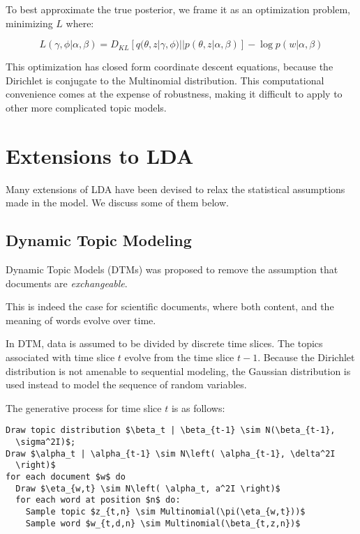\documentclass[letterpaper]{article}
\begin{document}
To best approximate the true posterior, we frame it as an optimization
problem, minimizing $L$ where:

\begin{equation}
L(\gamma, \phi | \alpha, \beta) = D_{KL}\left[ q(\theta, z | \gamma,
  \phi) || p(\theta, z | \alpha, \beta) \right] - \log p(w | \alpha, \beta)
\end{equation}

This optimization has closed form coordinate descent equations,
because the Dirichlet is conjugate to the Multinomial distribution.
This computational convenience comes at the expense of robustness,
making it difficult to apply to other more complicated topic models.

\section{Extensions to LDA}
\label{sec:ext:LDA}
Many extensions of LDA have been devised to relax the statistical
assumptions made in the model. We discuss some of them below.

\subsection{Dynamic Topic Modeling}
\label{sub:dtm}
Dynamic Topic Models (DTMs) was proposed to
remove the assumption that documents are \textit{exchangeable}.
\citep{blei2006dynamic}

This is indeed the case for scientific documents, where both content,
and the meaning of words evolve over time.

In DTM, data is assumed to be divided by discrete time slices. The
topics associated with time slice $t$ evolve from the time slice
$t-1$. Because the Dirichlet distribution is not amenable to
sequential modeling, the Gaussian distribution is used instead to
model the sequence of random variables.

The generative process for time slice $t$ is as follows:

\begin{lstlisting}[mathescape=true]
Draw topic distribution $\beta_t | \beta_{t-1} \sim N(\beta_{t-1},
  \sigma^2I)$;
Draw $\alpha_t | \alpha_{t-1} \sim N\left( \alpha_{t-1}, \delta^2I
  \right)$
for each document $w$ do
  Draw $\eta_{w,t} \sim N\left( \alpha_t, a^2I \right)$
  for each word at position $n$ do:
    Sample topic $z_{t,n} \sim Multinomial(\pi(\eta_{w,t}))$
    Sample word $w_{t,d,n} \sim Multinomial(\beta_{t,z,n})$
\end{lstlisting}
\end{document}
